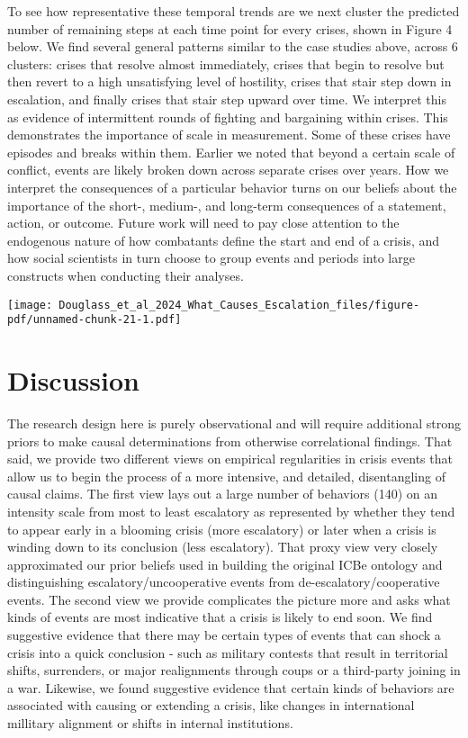\documentclass[
  letterpaper,
  DIV=11,
  numbers=noendperiod]{scrartcl}
\begin{document}
To see how representative these temporal trends are we next cluster the
predicted number of remaining steps at each time point for every crises,
shown in Figure 4 below. We find several general patterns similar to the
case studies above, across 6 clusters: crises that resolve almost
immediately, crises that begin to resolve but then revert to a high
unsatisfying level of hostility, crises that stair step down in
escalation, and finally crises that stair step upward over time. We
interpret this as evidence of intermittent rounds of fighting and
bargaining within crises. This demonstrates the importance of scale in
measurement. Some of these crises have episodes and breaks within them.
Earlier we noted that beyond a certain scale of conflict, events are
likely broken down across separate crises over years. How we interpret
the consequences of a particular behavior turns on our beliefs about the
importance of the short-, medium-, and long-term consequences of a
statement, action, or outcome. Future work will need to pay close
attention to the endogenous nature of how combatants define the start
and end of a crisis, and how social scientists in turn choose to group
events and periods into large constructs when conducting their analyses.

\texttt{[image: Douglass\_et\_al\_2024\_What\_Causes\_Escalation\_files/figure-pdf/unnamed-chunk-21-1.pdf]}

\section{Discussion}\label{discussion}

The research design here is purely observational and will require
additional strong priors to make causal determinations from otherwise
correlational findings. That said, we provide two different views on
empirical regularities in crisis events that allow us to begin the
process of a more intensive, and detailed, disentangling of causal
claims. The first view lays out a large number of behaviors (140) on an
intensity scale from most to least escalatory as represented by whether
they tend to appear early in a blooming crisis (more escalatory) or
later when a crisis is winding down to its conclusion (less escalatory).
That proxy view very closely approximated our prior beliefs used in
building the original ICBe ontology and distinguishing
escalatory/uncooperative events from de-escalatory/cooperative events.
The second view we provide complicates the picture more and asks what
kinds of events are most indicative that a crisis is likely to end soon.
We find suggestive evidence that there may be certain types of events
that can shock a crisis into a quick conclusion - such as military
contests that result in territorial shifts, surrenders, or major
realignments through coups or a third-party joining in a war. Likewise,
we found suggestive evidence that certain kinds of behaviors are
associated with causing or extending a crisis, like changes in
international millitary alignment or shifts in internal institutions.
\end{document}
